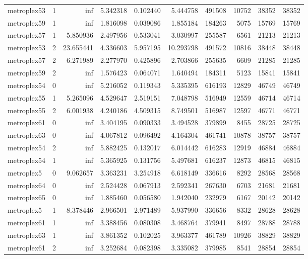 \begin{longtable}{|l|r|r|r|r|r|r|r|r|r|}
metroplex53 & 1 & inf & 5.342318 & 0.102440 & 5.444758 & 491508 & 10752 & 38352 & 38352 \\
metroplex59 & 1 & inf & 1.816098 & 0.039086 & 1.855184 & 184263 & 5075 & 15769 & 15769 \\
metroplex57 & 1 & 5.850936 & 2.497956 & 0.533041 & 3.030997 & 255587 & 6561 & 21213 & 21213 \\
metroplex53 & 2 & 23.655441 & 4.336603 & 5.957195 & 10.293798 & 491572 & 10816 & 38448 & 38448 \\
metroplex57 & 2 & 6.271989 & 2.277970 & 0.425896 & 2.703866 & 255635 & 6609 & 21285 & 21285 \\
metroplex59 & 2 & inf & 1.576423 & 0.064071 & 1.640494 & 184311 & 5123 & 15841 & 15841 \\
metroplex54 & 0 & inf & 5.216052 & 0.119343 & 5.335395 & 616193 & 12829 & 46749 & 46749 \\
metroplex55 & 1 & 5.265096 & 4.529647 & 2.519151 & 7.048798 & 516949 & 12559 & 46714 & 46714 \\
metroplex55 & 2 & 6.001938 & 4.240186 & 4.509315 & 8.749501 & 516987 & 12597 & 46771 & 46771 \\
metroplex61 & 0 & inf & 3.404195 & 0.090333 & 3.494528 & 379899 & 8455 & 28725 & 28725 \\
metroplex63 & 0 & inf & 4.067812 & 0.096492 & 4.164304 & 461741 & 10878 & 38757 & 38757 \\
metroplex54 & 2 & inf & 5.882425 & 0.132017 & 6.014442 & 616283 & 12919 & 46884 & 46884 \\
metroplex54 & 1 & inf & 5.365925 & 0.131756 & 5.497681 & 616237 & 12873 & 46815 & 46815 \\
metroplex5 & 0 & 9.062657 & 3.363231 & 3.254918 & 6.618149 & 336616 & 8292 & 28568 & 28568 \\
metroplex64 & 0 & inf & 2.524428 & 0.067913 & 2.592341 & 267630 & 6703 & 21681 & 21681 \\
metroplex65 & 0 & inf & 1.885460 & 0.056580 & 1.942040 & 232979 & 6167 & 20142 & 20142 \\
metroplex5 & 1 & 8.378446 & 2.966501 & 2.971489 & 5.937990 & 336656 & 8332 & 28628 & 28628 \\
metroplex61 & 1 & inf & 3.388456 & 0.080308 & 3.468764 & 379941 & 8497 & 28788 & 28788 \\
metroplex63 & 1 & inf & 3.861352 & 0.102025 & 3.963377 & 461789 & 10926 & 38829 & 38829 \\
metroplex61 & 2 & inf & 3.252684 & 0.082398 & 3.335082 & 379985 & 8541 & 28854 & 28854 \\

\end{longtable}
